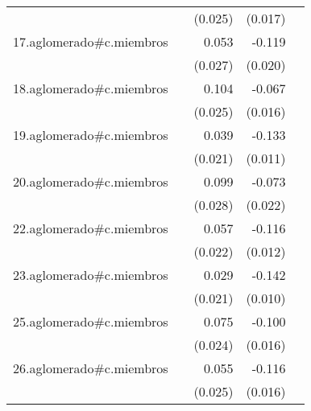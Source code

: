 {\begin{longtable}{l*{4}{D{.}{.}{-1}}}
            &                     &     (0.025)         &     (0.017)         &                     \\
\addlinespace
17.aglomerado#c.miembros&                     &       0.053\sym{*}  &      -0.119\sym{***}&                     \\
            &                     &     (0.027)         &     (0.020)         &                     \\
\addlinespace
18.aglomerado#c.miembros&                     &       0.104\sym{***}&      -0.067\sym{***}&                     \\
            &                     &     (0.025)         &     (0.016)         &                     \\
\addlinespace
19.aglomerado#c.miembros&                     &       0.039         &      -0.133\sym{***}&                     \\
            &                     &     (0.021)         &     (0.011)         &                     \\
\addlinespace
20.aglomerado#c.miembros&                     &       0.099\sym{***}&      -0.073\sym{***}&                     \\
            &                     &     (0.028)         &     (0.022)         &                     \\
\addlinespace
22.aglomerado#c.miembros&                     &       0.057\sym{**} &      -0.116\sym{***}&                     \\
            &                     &     (0.022)         &     (0.012)         &                     \\
\addlinespace
23.aglomerado#c.miembros&                     &       0.029         &      -0.142\sym{***}&                     \\
            &                     &     (0.021)         &     (0.010)         &                     \\
\addlinespace
25.aglomerado#c.miembros&                     &       0.075\sym{**} &      -0.100\sym{***}&                     \\
            &                     &     (0.024)         &     (0.016)         &                     \\
\addlinespace
26.aglomerado#c.miembros&                     &       0.055\sym{*}  &      -0.116\sym{***}&                     \\
            &                     &     (0.025)         &     (0.016)         &                     \\

\end{longtable}}
